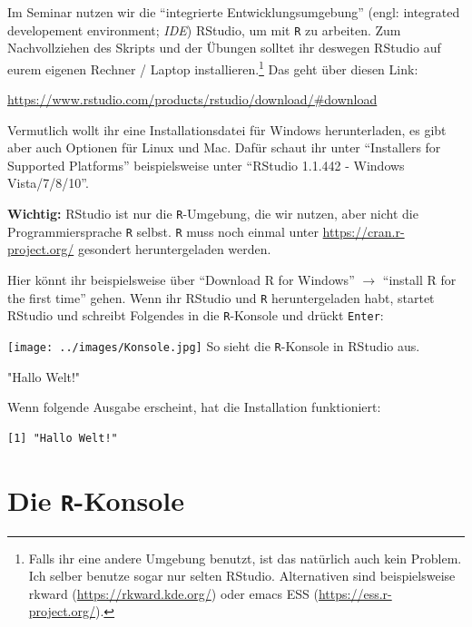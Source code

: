 \documentclass[12pt,]{tufte-book}
\newenvironment{Shaded}{\begin{snugshade}}{\end{snugshade}}
\newcommand{\StringTok}[1]{\textcolor[rgb]{0.31,0.60,0.02}{#1}}
\theoremstyle{definition}
\theoremstyle{definition}
\theoremstyle{definition}
\theoremstyle{remark}
\begin{document}
Im Seminar nutzen wir die ``integrierte Entwicklungsumgebung'' (engl:
integrated developement environment; \emph{IDE}) RStudio, um mit
\texttt{R} zu arbeiten. Zum Nachvollziehen des Skripts und der Übungen
solltet ihr deswegen RStudio auf eurem eigenen Rechner / Laptop
installieren.\footnote{Falls ihr eine andere Umgebung benutzt, ist das
  natürlich auch kein Problem. Ich selber benutze sogar nur selten
  RStudio. Alternativen sind beispielsweise rkward
  (\url{https://rkward.kde.org/}) oder emacs ESS
  (\url{https://ess.r-project.org/}).} Das geht über diesen Link:

\url{https://www.rstudio.com/products/rstudio/download/\#download}

Vermutlich wollt ihr eine Installationsdatei für Windows herunterladen,
es gibt aber auch Optionen für Linux und Mac. Dafür schaut ihr unter
``Installers for Supported Platforms'' beispielsweise unter ``RStudio
1.1.442 - Windows Vista/7/8/10''.

\textbf{Wichtig:} RStudio ist nur die \texttt{R}-Umgebung, die wir
nutzen, aber nicht die Programmiersprache \texttt{R} selbst. \texttt{R}
muss noch einmal unter \url{https://cran.r-project.org/} gesondert
heruntergeladen werden.

Hier könnt ihr beispielsweise über ``Download R for Windows'' \(\to\)
``install R for the first time'' gehen. Wenn ihr RStudio und \texttt{R}
heruntergeladen habt, startet RStudio und schreibt Folgendes in die
\texttt{R}-Konsole und drückt \texttt{Enter}:

\begin{marginfigure}
\texttt{[image: ../images/Konsole.jpg]} So sieht die \texttt{R}-Konsole
in RStudio aus.
\end{marginfigure}

\begin{Shaded}
\begin{Highlighting}[]

\StringTok{"Hallo Welt!"}
\end{Highlighting}
\end{Shaded}

Wenn folgende Ausgabe erscheint, hat die Installation funktioniert:

\begin{verbatim}
[1] "Hallo Welt!"
\end{verbatim}

\section{\texorpdfstring{Die
\texttt{R}-Konsole}{Die R-Konsole}}\label{die-r-konsole}
\end{document}
